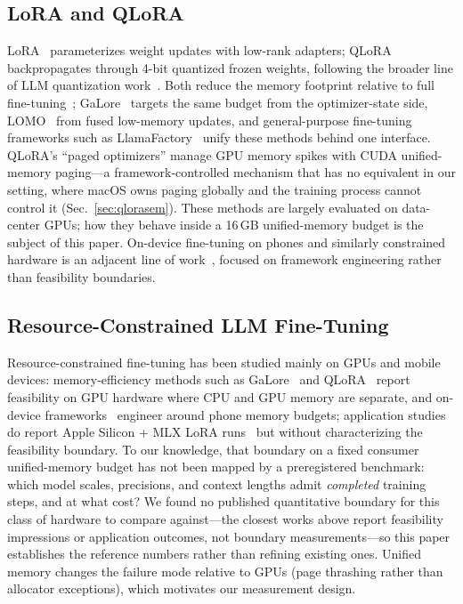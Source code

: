 \documentclass[10pt,twocolumn]{article}
\begin{document}
\subsection{LoRA and QLoRA}
LoRA~\cite{hu2022lora} parameterizes weight updates with low-rank adapters;
QLoRA~\cite{dettmers2023qlora} backpropagates through 4-bit quantized frozen
weights, following the broader line of LLM quantization
work~\cite{dettmers2022llmint8}. Both reduce the memory footprint relative to
full fine-tuning~\cite{houlsby2019parameter,chen2016training};
GaLore~\cite{zhao2024galore} targets the same budget from the optimizer-state
side, LOMO~\cite{lv2024lomo} from fused low-memory updates, and
general-purpose fine-tuning frameworks such as
LlamaFactory~\cite{zheng2024llamafactory} unify these methods behind one
interface. QLoRA's ``paged optimizers'' manage GPU memory spikes with
CUDA unified-memory paging---a framework-controlled mechanism that has no
equivalent in our setting, where macOS owns paging globally and the training
process cannot control it (Sec.~\ref{sec:qlorasem}). These methods are
largely evaluated on data-center GPUs; how they behave inside a 16\,GB
unified-memory budget is the subject of this paper. On-device fine-tuning
on phones and similarly constrained hardware is an adjacent line of
work~\cite{geng2025mobilefinetuner}, focused on framework engineering
rather than feasibility boundaries.

\subsection{Resource-Constrained LLM Fine-Tuning}
Resource-constrained fine-tuning has been studied mainly on GPUs and
mobile devices: memory-efficiency methods such as
GaLore~\cite{zhao2024galore} and QLoRA~\cite{dettmers2023qlora} report
feasibility on GPU hardware where CPU and GPU memory are separate, and
on-device frameworks~\cite{geng2025mobilefinetuner} engineer around
phone memory budgets; application studies do report Apple Silicon + MLX
LoRA runs~\cite{baral2026distillation} but without characterizing the
feasibility boundary. To our knowledge, that boundary on a fixed
consumer unified-memory budget has not been mapped by a preregistered
benchmark: which model scales, precisions, and context lengths admit
\emph{completed} training steps, and at what cost? We found no
published quantitative boundary for this class of hardware to compare
against---the closest works above report feasibility impressions or
application outcomes, not boundary measurements---so this paper
establishes the reference numbers rather than refining existing ones.
Unified memory changes the failure mode relative to GPUs (page
thrashing rather than allocator exceptions), which motivates our
measurement design.
\end{document}
